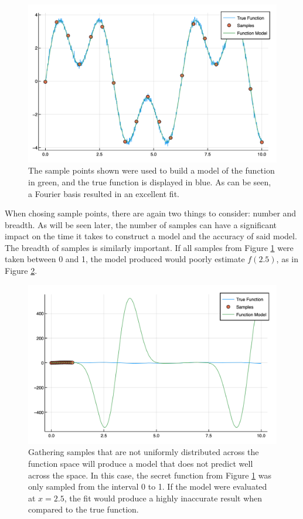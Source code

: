 \begin{figure}[h]
\includegraphics[scale = 0.27]{Figures/2dFourier}
\caption{The sample points shown were used to build a model of the function in green, and the true function is displayed in blue. As can be seen, a Fourier basis resulted in an excellent fit. 
\label{fig:2dFourier}} 
\end{figure}

\par When chosing sample points, there are again two things to consider: number and breadth. As will be seen later, the number of samples can have a significant impact on the time it takes to construct a model and the accuracy of said model. The breadth of samples is similarly important. If all samples from Figure \ref{fig:2dFourier} were taken between 0 and 1, the model produced would poorly estimate $f(2.5)$, as in Figure \ref{fig:poorSamps}. 

\begin{figure}[h]
\includegraphics[scale = 0.4]{Figures/poorSamps}
\caption{Gathering samples that are not uniformly distributed across the function space will produce a model that does not predict well across the space. In this case, the secret function from Figure \ref{fig:2dFourier} was only sampled from the interval 0 to 1. If the model were evaluated at $x=2.5$, the fit would produce a highly inaccurate result when compared to the true function.
\label{fig:poorSamps}} 
\end{figure}

